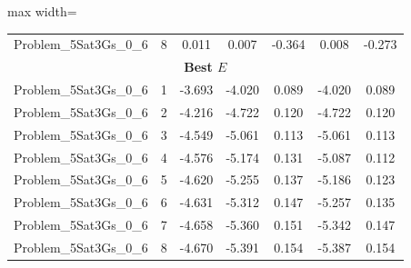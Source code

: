 \begin{table}[!htbp]
\begin{adjustbox}{max width=\columnwidth}
\begin{tabularx}{\columnwidth}{c|c c c c c c}
            Problem\_5Sat3Gs\_0\_6 & 8 & 0.011 & 0.007 & -0.364 & 0.008 & -0.273 \\
            \multicolumn{7}{c}{\textbf{Best $E$}} \\ \midrule
            Problem\_5Sat3Gs\_0\_6 & 1 & -3.693 & -4.020 & 0.089 & -4.020 & 0.089 \\
            Problem\_5Sat3Gs\_0\_6 & 2 & -4.216 & -4.722 & 0.120 & -4.722 & 0.120 \\
            Problem\_5Sat3Gs\_0\_6 & 3 & -4.549 & -5.061 & 0.113 & -5.061 & 0.113 \\
            Problem\_5Sat3Gs\_0\_6 & 4 & -4.576 & -5.174 & 0.131 & -5.087 & 0.112 \\
            Problem\_5Sat3Gs\_0\_6 & 5 & -4.620 & -5.255 & 0.137 & -5.186 & 0.123 \\
            Problem\_5Sat3Gs\_0\_6 & 6 & -4.631 & -5.312 & 0.147 & -5.257 & 0.135 \\
            Problem\_5Sat3Gs\_0\_6 & 7 & -4.658 & -5.360 & 0.151 & -5.342 & 0.147 \\
            Problem\_5Sat3Gs\_0\_6 & 8 & -4.670 & -5.391 & 0.154 & -5.387 & 0.154 \\
            \bottomrule
        \end{tabularx}
    \end{adjustbox}
\end{table}

